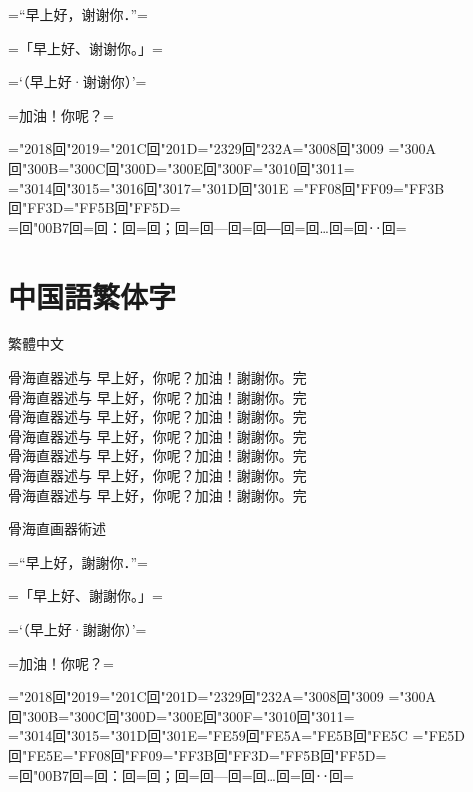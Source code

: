 \documentclass[landscape]{utarticle}
\begin{document}
\upschrmm
=“早上好，谢谢你．”=

=「早上好、谢谢你。」=

=‘（早上好·谢谢你）’=

=加油！你呢？=

=\kchar"2018回\kchar"2019=\kchar"201C回\kchar"201D=\kchar"2329回\kchar"232A=\kchar"3008回\kchar"3009%
=\kchar"300A回\kchar"300B=\kchar"300C回\kchar"300D=\kchar"300E回\kchar"300F=\kchar"3010回\kchar"3011=\\
=\kchar"3014回\kchar"3015=\kchar"3016回\kchar"3017=\kchar"301D回\kchar"301E%
=\kchar"FF08回\kchar"FF09=\kchar"FF3B回\kchar"FF3D=\kchar"FF5B回\kchar"FF5D=\\
=回\kchar"00B7回=回：回=回；回=回—回=回―回=回…回=回‥回=


\newpage

\section{中国語繁体字}
\upschgtb 繁體中文

\uptchrml 骨海直器述与 早上好，你呢？加油！謝謝你。完\\
\uptchrmm 骨海直器述与 早上好，你呢？加油！謝謝你。完\\
\uptchrmb 骨海直器述与 早上好，你呢？加油！謝謝你。完\\
\uptchgtm 骨海直器述与 早上好，你呢？加油！謝謝你。完\\
\uptchgtb 骨海直器述与 早上好，你呢？加油！謝謝你。完\\
\uptchgte 骨海直器述与 早上好，你呢？加油！謝謝你。完\\
\uptchgth 骨海直器述与 早上好，你呢？加油！謝謝你。完\\

\uptchrmm

骨海直画器術述

=“早上好，謝謝你．”=

=「早上好、謝謝你。」=

=‘（早上好·謝謝你）’=

=加油！你呢？=

=\kchar"2018回\kchar"2019=\kchar"201C回\kchar"201D=\kchar"2329回\kchar"232A=\kchar"3008回\kchar"3009%
=\kchar"300A回\kchar"300B=\kchar"300C回\kchar"300D=\kchar"300E回\kchar"300F=\kchar"3010回\kchar"3011=\\
=\kchar"3014回\kchar"3015=\kchar"301D回\kchar"301E=\kchar"FE59回\kchar"FE5A=\kchar"FE5B回\kchar"FE5C%
=\kchar"FE5D回\kchar"FE5E=\kchar"FF08回\kchar"FF09=\kchar"FF3B回\kchar"FF3D=\kchar"FF5B回\kchar"FF5D=\\
=回\kchar"00B7回=回：回=回；回=回—回=回…回=回‥回=
\end{document}
